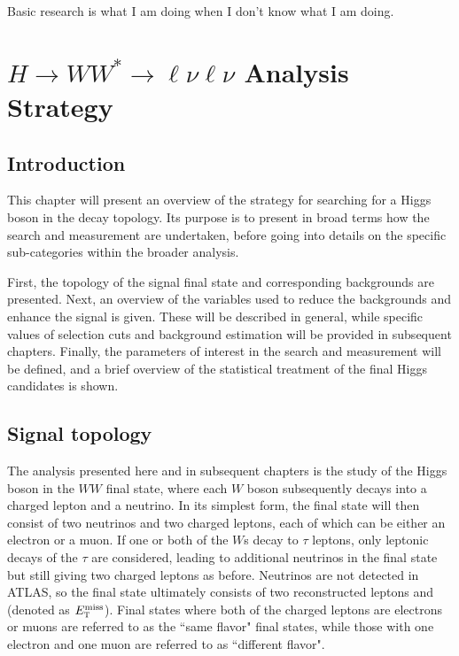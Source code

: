 \begin{savequote}[75mm]
Basic research is what I am doing when I don't know what I am doing.
\end{savequote}

\chapter{$H\rightarrow WW^{*}\rightarrow \ell\nu\ell\nu$ Analysis Strategy}

\section{Introduction}

This chapter will present an overview of the strategy for searching for a Higgs boson in the 
\HWWfull decay topology. Its purpose is to present in broad terms how the search and measurement are undertaken, before going into details on the specific sub-categories within the broader analysis. 

First, the topology of the signal final state and corresponding backgrounds are
presented. Next, an overview of the variables used to reduce the backgrounds and enhance the
signal is given. These will be described in general, while specific values of selection cuts and background estimation will be provided in subsequent chapters. Finally, the parameters of interest in the search and measurement will be defined, 
and a brief overview of the statistical treatment of the final Higgs candidates is shown.


\section{Signal topology}

\label{sec:sigtopology}

The analysis presented here and in subsequent chapters is the study of the Higgs boson in the $WW$ final state,
where each $W$ boson subsequently decays into a charged lepton and a neutrino. In its simplest form, the final state will then consist of two neutrinos and two charged leptons, each of which can be either an electron or a muon. If one or both of the $W$s decay to $\tau$ leptons, only leptonic decays of the $\tau$ are considered, leading to additional neutrinos in the final state but still giving two charged leptons as before. Neutrinos are not detected in ATLAS, so the final state ultimately consists of two reconstructed leptons and \met (denoted as $E_{\textrm{\footnotesize\sc t}}^{\rm miss}$). Final states where both of the charged leptons are electrons or muons are referred to as the ``same flavor" final states, while those with one electron and one muon are referred to as ``different flavor".

